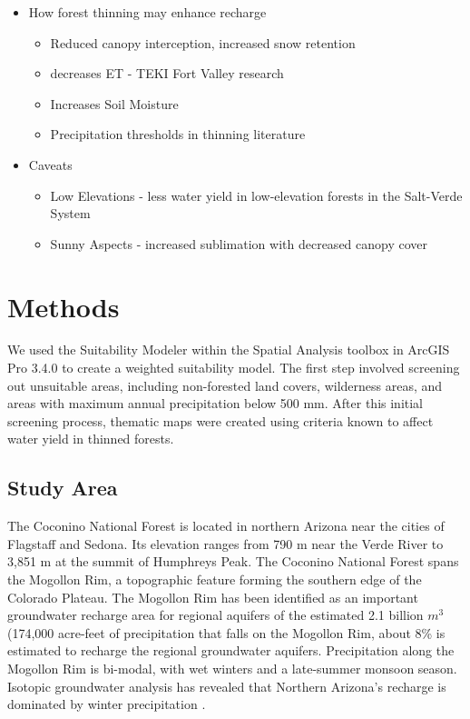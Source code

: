 \documentclass[
  number]{elsarticle}
\begin{document}
\begin{itemize}
\item
  How forest thinning may enhance recharge

  \begin{itemize}
  \item
    Reduced canopy interception, increased snow retention
  \item
    decreases ET - TEKI Fort Valley research
  \item
    Increases Soil Moisture
  \item
    Precipitation thresholds in thinning literature
  \end{itemize}
\item
  Caveats

  \begin{itemize}
  \item
    Low Elevations - less water yield in low-elevation forests in the
    Salt-Verde System \citep{biederman_streamflow_2022}
  \item
    Sunny Aspects - increased sublimation with decreased canopy cover
    \citep{biederman_recent_2015}
  \end{itemize}
\end{itemize}

\section{Methods}\label{methods}

We used the Suitability Modeler within the Spatial Analysis toolbox in
ArcGIS Pro 3.4.0 to create a weighted suitability model. The first step
involved screening out unsuitable areas, including non-forested land
covers, wilderness areas, and areas with maximum annual precipitation
below 500 mm. After this initial screening process, thematic maps were
created using criteria known to affect water yield in thinned forests.

\subsection{Study Area}\label{study-area}

The Coconino National Forest is located in northern Arizona near the
cities of Flagstaff and Sedona. Its elevation ranges from 790 m near the
Verde River to 3,851 m at the summit of Humphreys Peak. The Coconino
National Forest spans the Mogollon Rim, a topographic feature forming
the southern edge of the Colorado Plateau. The Mogollon Rim has been
identified as an important groundwater recharge area for regional
aquifers \citep{parker2005} of the estimated 2.1 billion \(m^3\)
(174,000 acre-feet of precipitation that falls on the Mogollon Rim,
about 8\% is estimated to recharge the regional groundwater
aquifers\citep{parker2005}. Precipitation along the Mogollon Rim is
bi-modal, with wet winters and a late-summer monsoon season. Isotopic
groundwater analysis has revealed that Northern Arizona's recharge is
dominated by winter precipitation \citep{eastoe2007, eastoe2023}.
\end{document}
